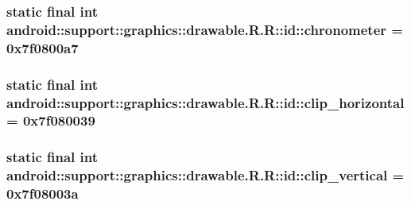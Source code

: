 \hypertarget{classandroid_1_1support_1_1graphics_1_1drawable_1_1_r_1_1id_38138203dce950293a03fa31d32e1225}{
\subsubsection[{chronometer}]{\setlength{\rightskip}{0pt plus 5cm}static final int android::support::graphics::drawable.R.R::id::chronometer = 0x7f0800a7}}
\label{classandroid_1_1support_1_1graphics_1_1drawable_1_1_r_1_1id_38138203dce950293a03fa31d32e1225}


\hypertarget{classandroid_1_1support_1_1graphics_1_1drawable_1_1_r_1_1id_ab8efd838fe840ce703a2588c81af8bb}{
\subsubsection[{clip\_\-horizontal}]{\setlength{\rightskip}{0pt plus 5cm}static final int android::support::graphics::drawable.R.R::id::clip\_\-horizontal = 0x7f080039}}
\label{classandroid_1_1support_1_1graphics_1_1drawable_1_1_r_1_1id_ab8efd838fe840ce703a2588c81af8bb}


\hypertarget{classandroid_1_1support_1_1graphics_1_1drawable_1_1_r_1_1id_b213cd8ff91b180d99bb2c1db1764d94}{
\subsubsection[{clip\_\-vertical}]{\setlength{\rightskip}{0pt plus 5cm}static final int android::support::graphics::drawable.R.R::id::clip\_\-vertical = 0x7f08003a}}
\label{classandroid_1_1support_1_1graphics_1_1drawable_1_1_r_1_1id_b213cd8ff91b180d99bb2c1db1764d94}


